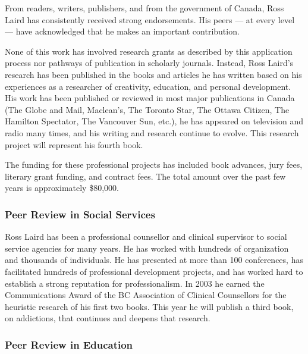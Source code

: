\documentclass[letterpaper,10pt,headsepline]{scrreprt}
\begin{document}
From readers, writers, publishers, and from the government of Canada, Ross
Laird has consistently received strong endorsements. His peers --- at every
level --- have acknowledged that he makes an important contribution.

None of this work has involved research grants as described by this
application process nor pathways of publication in scholarly journals.
Instead, Ross Laird's research has been published in the books and articles he
has written based on his experiences as a researcher of creativity, education,
and personal development. His work has been published or reviewed in most
major publications in Canada (The Globe and Mail, Maclean's, The Toronto Star,
The Ottawa Citizen, The Hamilton Spectator, The Vancouver Sun, etc.), he has
appeared on television and radio many times, and his writing and research
continue to evolve. This research project will represent his fourth book.

The funding for these professional projects has included book advances, jury
fees, literary grant funding, and contract fees. The total amount over the
past few years is approximately \$80,000.

\subsubsection{Peer Review in Social Services}

Ross Laird has been a professional counsellor and clinical supervisor to
social service agencies for many years. He has worked with hundreds of
organization and thousands of individuals. He has presented at more than 100
conferences, has facilitated hundreds of professional development projects,
and has worked hard to establish a strong reputation for professionalism. In
2003 he earned the Communications Award of the BC Association of Clinical
Counsellors for the heuristic research of his first two books. This year he
will publish a third book, on addictions, that continues and deepens that
research.

\subsubsection{Peer Review in Education}
\end{document}
